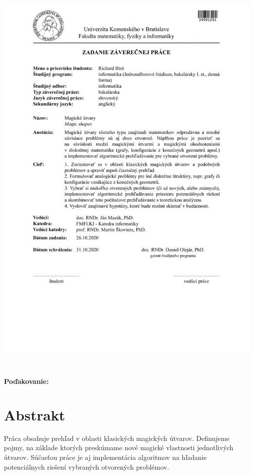 \documentclass[12pt, twoside]{book}
\begin{document}
\newpage 
\thispagestyle{empty}
\hspace{-2cm}\includegraphics[width=1.1\textwidth]{images/zadanie}


\frontmatter

\setcounter{page}{3}
\newpage 
~

\vfill
{\bf Poďakovanie:} 


\newpage 
\section*{Abstrakt}

Práca obsahuje prehľad v oblasti klasických magických útvarov. Definujeme pojmy, na základe ktorých preskúmame nové magické vlastnosti jednotlivých útvarov. Súčasťou práce je aj implementácia algoritmov na hľadanie potenciálnych riešení vybraných otvorených problémov. \\
\end{document}
